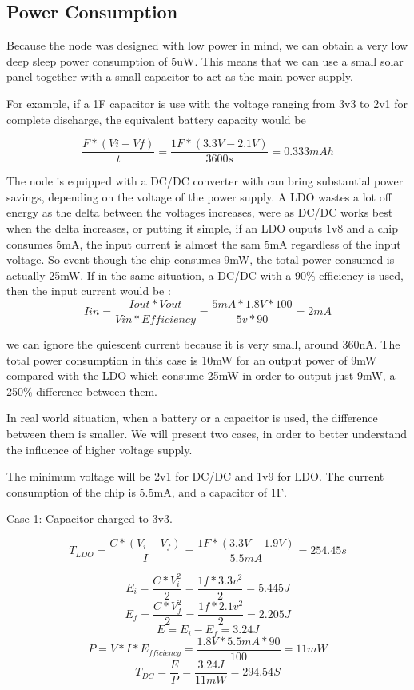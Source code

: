 \label{chap:results}


\subsection{Power Consumption}

Because the node was designed with low power in mind, we can obtain a very low deep sleep power
consumption of 5uW. This means that we can use a small solar panel together with a
small capacitor to act as the main power supply.

For example, if a 1F capacitor is use with the voltage ranging from 3v3 to 2v1 for complete
discharge, the equivalent battery capacity would be

$$ \frac{F * (Vi - Vf)}{t} = \frac{1F * (3.3V - 2.1V)}{3600s} = 0.333mAh$$

The node is equipped with a DC/DC converter with can bring substantial power savings, depending on
the voltage of the power supply. A LDO wastes a lot off energy as the delta between the
voltages increases, were as DC/DC works best when the delta increases, or putting it simple, if an
LDO ouputs 1v8 and a chip consumes 5mA, the input current is almost the sam 5mA regardless of the
input voltage. So event though the chip consumes 9mW, the total power consumed is actually 25mW. If
in the same situation, a DC/DC with a 90\% efficiency is used, then the input current would be :
$$Iin = \frac{Iout * Vout}{Vin*Efficiency} = \frac{5mA * 1.8V*100}{5v*90}= 2mA$$


we can ignore the quiescent current because it is very small, around 360nA. The total power
consumption in this case is 10mW for an output power of 9mW compared with the LDO which consume
25mW in order to output just 9mW, a 250\% difference between them.

In real world situation, when a battery or a capacitor is used, the difference between them is
smaller. We will present two cases, in order to better understand the influence of higher
voltage supply.

The minimum voltage will be 2v1 for DC/DC and 1v9 for LDO. The current consumption of the chip is
5.5mA, and a capacitor of 1F.

Case 1: Capacitor charged to 3v3.

$$T_{LDO} = \frac{C * (V_i - V_f)}{I}=\frac{1F * (3.3V - 1.9V)}{5.5mA} = 254.45s $$

$$E_i = \frac{C*V_i^2}{2} = \frac{1f*3.3v^2}{2} =5.445J$$
$$E_f = \frac{C*V_f^2}{2} = \frac{1f*2.1v^2}{2} =2.205J$$
$$E = E_i - E_f = 3.24J$$
$$P = V*I*E_{fficiency }= \frac{1.8V * 5.5mA * 90}{100} = 11mW$$
$$T_{DC} = \frac{E}{P} = \frac{3.24J}{11mW} =294.54S $$

